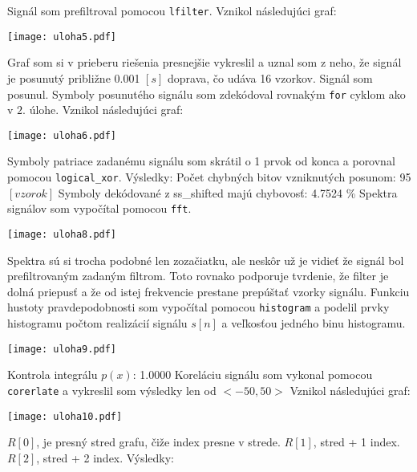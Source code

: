 \documentclass[11pt]{homework}
\begin{document}
Signál som prefiltroval pomocou \verb|lfilter|.\newline
Vznikol následujúci graf:
\begin{center}
\texttt{[image: uloha5.pdf]}
\end{center}
Graf som si v prieberu riešenia presnejšie vykreslil a uznal som z neho, že signál je posunutý približne 0.001 $[s]$ doprava, čo udáva 16 vzorkov.\newline
{}
Signál som posunul. Symboly posunutého signálu som zdekódoval rovnakým \verb|for| cyklom ako v $2.$ úlohe.\newline
Vznikol následujúci graf:
\begin{center}
\texttt{[image: uloha6.pdf]}
\end{center}
Symboly patriace zadanému signálu som skrátil o 1 prvok od konca a porovnal pomocou \verb|logical_xor|.
Výsledky:\newline
Počet chybných bitov vzniknutých posunom: 95 $[vzorok]$ \newline
Symboly dekódované z ss\_shifted majú chybovosť: 4.7524 \% \newline
{}
Spektra signálov som vypočítal pomocou \verb|fft|.
\begin{center}
\texttt{[image: uloha8.pdf]}
\end{center}
Spektra sú si trocha podobné len zozačiatku, ale neskôr už je vidieť že signál bol prefiltrovaným zadaným filtrom. Toto rovnako podporuje tvrdenie, že filter je dolná priepusť a že od istej frekvencie prestane prepúštať vzorky signálu.\newline
{}
Funkciu hustoty pravdepodobnosti som vypočítal pomocou \verb|histogram| a podelil prvky histogramu počtom realizácií signálu $s[n]$ a veľkosťou jedného binu histogramu.
\begin{center}
\texttt{[image: uloha9.pdf]}
\end{center}
Kontrola integrálu $p(x)$: 1.0000 \newline
{}
Koreláciu signálu som vykonal pomocou \verb|corerlate| a vykreslil som výsledky len od $<-50,50>$\newline
Vznikol následujúci graf:
\begin{center}
\texttt{[image: uloha10.pdf]}
\end{center}
$R[0]$, je presný stred grafu, čiže index presne v strede. $R[1]$, stred + 1 index. $R[2]$, stred + 2 index.
Výsledky: \newline
\end{document}
